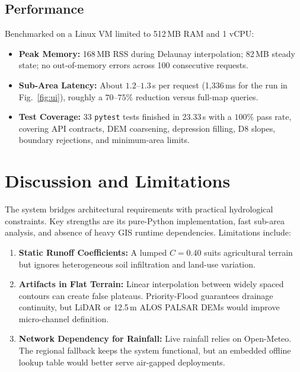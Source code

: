 \documentclass[manuscript,screen,review]{acmart}
\begin{document}
\subsection{Performance}
Benchmarked on a Linux VM limited to 512\,MB RAM and 1 vCPU:
\begin{itemize}
    \item \textbf{Peak Memory:} 168\,MB RSS during Delaunay interpolation; 82\,MB steady state; no out-of-memory errors across 100 consecutive requests.
    \item \textbf{Sub-Area Latency:} About $1.2$--$1.3$\,s per request (1,336\,ms for the run in Fig.~\ref{fig:ui}), roughly a $70$--$75\%$ reduction versus full-map queries.
    \item \textbf{Test Coverage:} 33 \texttt{pytest} tests finished in 23.33\,s with a $100\%$ pass rate, covering API contracts, DEM coarsening, depression filling, D8 slopes, boundary rejections, and minimum-area limits.
\end{itemize}

\section{Discussion and Limitations}
\label{sec:discussion}
The system bridges architectural requirements with practical hydrological constraints. Key strengths are its pure-Python implementation, fast sub-area analysis, and absence of heavy GIS runtime dependencies. Limitations include:
\begin{enumerate}
    \item \textbf{Static Runoff Coefficients:} A lumped $C = 0.40$ suits agricultural terrain but ignores heterogeneous soil infiltration and land-use variation.
    \item \textbf{Artifacts in Flat Terrain:} Linear interpolation between widely spaced contours can create false plateaus. Priority-Flood guarantees drainage continuity, but LiDAR or 12.5\,m ALOS PALSAR DEMs would improve micro-channel definition.
    \item \textbf{Network Dependency for Rainfall:} Live rainfall relies on Open-Meteo. The regional fallback keeps the system functional, but an embedded offline lookup table would better serve air-gapped deployments.
\end{enumerate}
\end{document}
